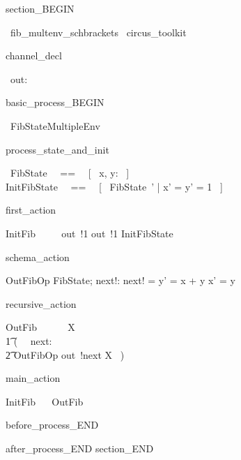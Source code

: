 section_BEGIN
\begin{zsection}
  \SECTION\ fib\_multenv\_schbrackets \parents\ circus\_toolkit
\end{zsection}
channel_decl
\begin{circus}
    \circchannel\ out: \nat
\end{circus}
basic_process_BEGIN
\begin{circus}
    \circprocess\ FibStateMultipleEnv ~~\circdef~~ \circbegin
\end{circus}
process_state_and_init
\begin{circusaction}
    \circstate\ FibState ~~==~~ [~ x, y: \nat ~]  \land [ z: \nat ]\\
    InitFibState ~~==~~ [~ FibState~' | x' = y' = 1 ~]
\end{circusaction}
first_action
\begin{circusaction}
    InitFib ~~\circdef~~ out~!1 \then out~!1 \then \lschexpract InitFibState \rschexpract
\end{circusaction}
schema_action
\begin{schema}{OutFibOp}
    \Delta FibState; next!: \nat
\where
    next! = y' = x + y \land x' = y
\end{schema}
recursive_action
\begin{circusaction}
    OutFib ~~\circdef~~ \circmu\ X \circspot \\
    	\t1 (~ \circvar\ next: \nat \circspot \\
	   \t2 \lschexpract OutFibOp \rschexpract \circseq out~!next \then X ~)
\end{circusaction}
main_action
\begin{circusaction}
    \circspot InitFib ~\circseq~ OutFib
\end{circusaction}
before_process_END
\begin{circus}
    \circend
\end{circus}
after_process_END
section_END 